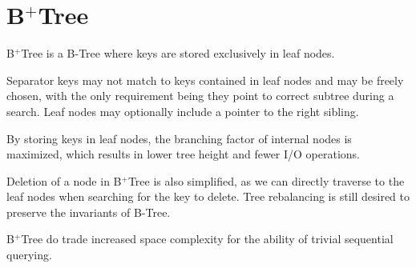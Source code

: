 \section{B$^+$Tree}

\begin{definition}
  B$^+$Tree is a B-Tree where keys are stored exclusively in leaf nodes.
\end{definition}

Separator keys may not match to keys contained in leaf nodes and may be freely chosen, with the only requirement being they point to correct subtree during a search. Leaf nodes may optionally include a pointer to the right sibling.



By storing keys in leaf nodes, the branching factor of internal nodes is maximized, which results in lower tree height and fewer I/O operations.

Deletion of a node in B$^+$Tree is also simplified, as we can directly traverse to the leaf nodes when searching for the key to delete. Tree rebalancing is still desired to preserve the invariants of B-Tree.

B$^+$Tree do trade increased space complexity for the ability of trivial sequential querying.